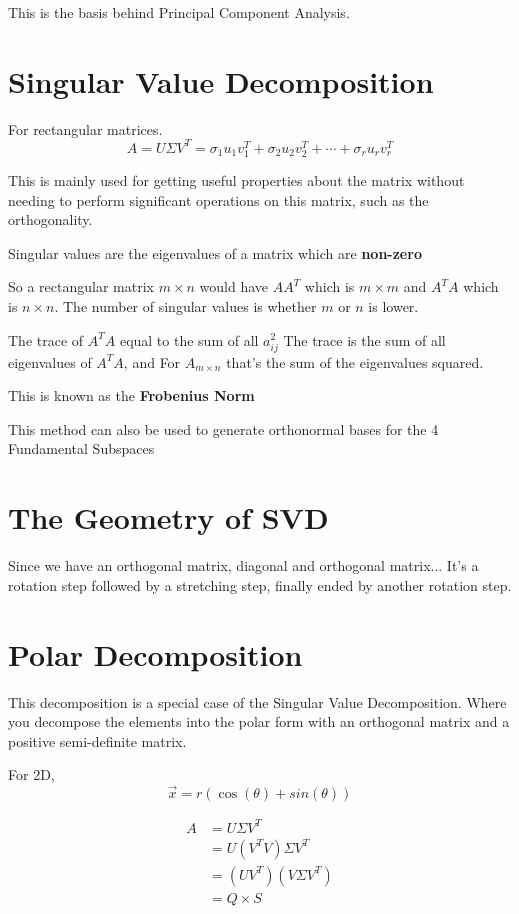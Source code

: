 \documentclass[twoside]{report}
\begin{document}
This is the basis behind Principal Component Analysis.
\section{Singular Value Decomposition}
For rectangular matrices.
\[ 
	A = U \Sigma V^T  = \sigma_1 u_1 v_1^T + \sigma_2u_2v_2^T + \cdots + \sigma_r u_r v_r^T
\]

This is mainly used for getting useful properties about the matrix without needing to perform significant operations on this matrix, such as the orthogonality.

\begin{note}
	Singular values are the eigenvalues of a matrix which are \textbf{non-zero}
\end{note}

So a rectangular matrix $m \times n$ would have $AA^T$ which is $m \times m$ and $A^TA$ which is $n \times n$. The number of singular values is whether $m$ or $n$ is lower.
	
\begin{note}
	The trace of $A^TA$ equal to the sum of all $a_{ij}^2$
	The trace is the sum of all eigenvalues of $A^T A$, and For $A_{m \times n}$ that's the sum of the eigenvalues squared.

	This is known as the \textbf{Frobenius Norm}
\end{note}
 
This method can also be used to generate orthonormal bases for the 4 Fundamental Subspaces


\section{The Geometry of SVD}
Since we have an orthogonal matrix, diagonal and orthogonal matrix... It's a rotation step followed by a  stretching step, finally ended by another rotation step.

\section{Polar Decomposition}
This decomposition is a special case of the Singular Value Decomposition. Where you decompose the elements into the polar form with an orthogonal matrix and a positive semi-definite matrix.

For 2D,
\[
	\vec{x} = r(\cos(\theta) + sin(\theta))
\]

\begin{align*}
	A &= U \Sigma V^T \\ 
	  &= U(V^TV) \Sigma V^T \\
	  &= (UV^T)(V\Sigma V^T)\\
	  &= Q \times S \\
\end{align*}
\end{document}
